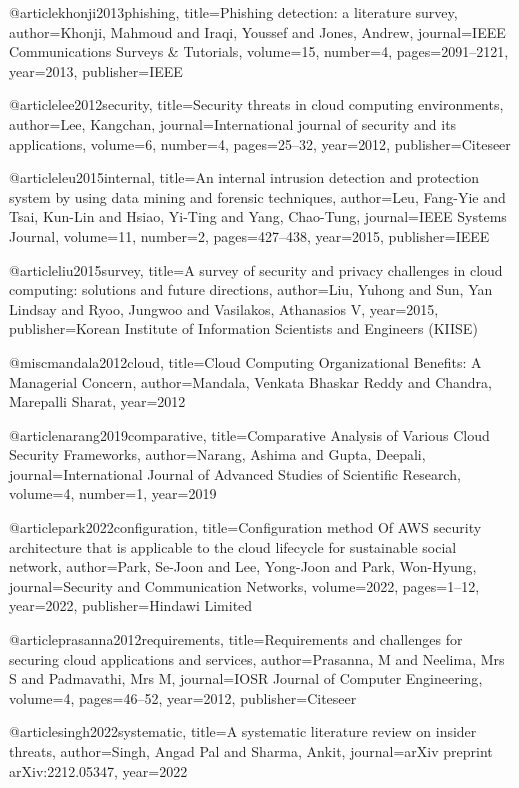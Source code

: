 @article{khonji2013phishing,
  title={Phishing detection: a literature survey},
  author={Khonji, Mahmoud and Iraqi, Youssef and Jones, Andrew},
  journal={IEEE Communications Surveys \& Tutorials},
  volume={15},
  number={4},
  pages={2091--2121},
  year={2013},
  publisher={IEEE}
}

@article{lee2012security,
title={Security threats in cloud computing environments},
author={Lee, Kangchan},
journal={International journal of security and its applications},
volume={6},
number={4},
pages={25--32},
year={2012},
publisher={Citeseer}
}

@article{leu2015internal,
title={An internal intrusion detection and protection system by using data mining and forensic techniques},
author={Leu, Fang-Yie and Tsai, Kun-Lin and Hsiao, Yi-Ting and Yang, Chao-Tung},
journal={IEEE Systems Journal},
volume={11},
number={2},
pages={427--438},
year={2015},
publisher={IEEE}
}

@article{liu2015survey,
title={A survey of security and privacy challenges in cloud computing: solutions and future directions},
author={Liu, Yuhong and Sun, Yan Lindsay and Ryoo, Jungwoo and Vasilakos, Athanasios V},
year={2015},
publisher={Korean Institute of Information Scientists and Engineers (KIISE)}
}

@misc{mandala2012cloud,
title={Cloud Computing Organizational Benefits: A Managerial Concern},
author={Mandala, Venkata Bhaskar Reddy and Chandra, Marepalli Sharat},
year={2012}
}

@article{narang2019comparative,
title={Comparative Analysis of Various Cloud Security Frameworks},
author={Narang, Ashima and Gupta, Deepali},
journal={International Journal of Advanced Studies of Scientific Research},
volume={4},
number={1},
year={2019}
}

@article{park2022configuration,
title={Configuration method Of AWS security architecture that is applicable to the cloud lifecycle for sustainable social network},
author={Park, Se-Joon and Lee, Yong-Joon and Park, Won-Hyung},
journal={Security and Communication Networks},
volume={2022},
pages={1--12},
year={2022},
publisher={Hindawi Limited}
}

@article{prasanna2012requirements,
title={Requirements and challenges for securing cloud applications and services},
author={Prasanna, M and Neelima, Mrs S and Padmavathi, Mrs M},
journal={IOSR Journal of Computer Engineering},
volume={4},
pages={46--52},
year={2012},
publisher={Citeseer}
}

@article{singh2022systematic,
title={A systematic literature review on insider threats},
author={Singh, Angad Pal and Sharma, Ankit},
journal={arXiv preprint arXiv:2212.05347},
year={2022}
}

